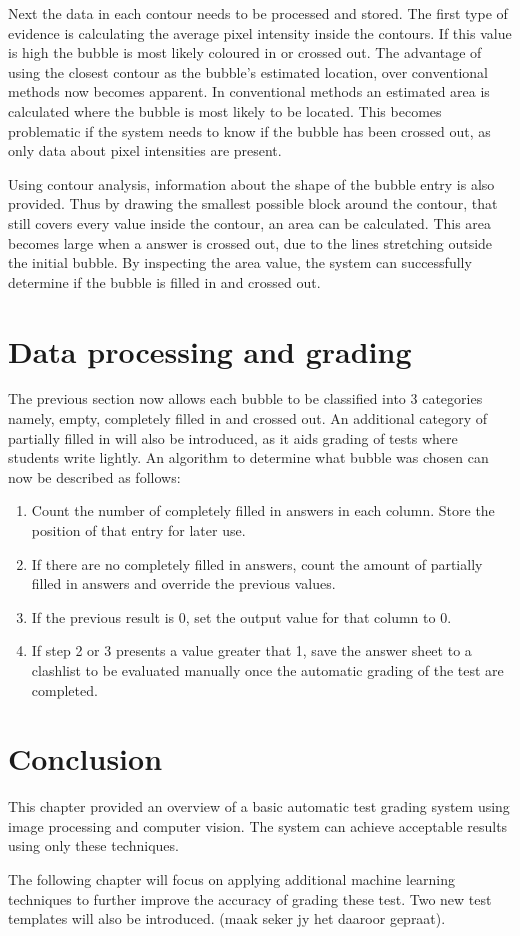 Next the data in each contour needs to be processed and stored. The first type of evidence is calculating the average pixel intensity inside the contours. If this value is high the bubble is most likely coloured in or crossed out. The advantage of using the closest contour as the bubble's estimated location, over conventional methods now becomes apparent. In conventional methods an estimated area is calculated where the bubble is most likely to be located. This becomes problematic if the system needs to know if the bubble has been crossed out, as only data about pixel intensities are present. 

Using contour analysis, information about the shape of the bubble entry is also provided. Thus by drawing the smallest possible block around the contour, that still covers every value inside the contour, an area can be calculated. This area becomes large when a answer is crossed out, due to the lines stretching outside the initial bubble. By inspecting the area value, the system can successfully determine if the bubble is filled in and crossed out.

\section{Data processing and grading}

The previous section now allows each bubble to be classified into 3 categories namely, empty, completely filled in and crossed out. An additional category of partially filled in will also be introduced, as it aids grading of tests where students write lightly. An algorithm to determine what bubble was chosen can now be described as follows:

\begin{enumerate}
\item Count the number of completely filled in answers in each column. Store the position of that entry for later use.
\item If there are no completely filled in answers, count the amount of partially filled in answers and override the previous values.
\item If the previous result is 0, set the output value for that column to 0.
\item If step 2 or 3 presents a value greater that 1, save the answer sheet to a clashlist to be evaluated manually once the automatic grading of the test are completed.
\end{enumerate}


\section{Conclusion}

This chapter provided an overview of a basic automatic test grading system using image processing and computer vision. The system can achieve acceptable results using only these techniques.

The following chapter will focus on applying additional machine learning techniques to further improve the accuracy of grading these test. Two new test templates will also be introduced. (maak seker jy het daaroor gepraat).